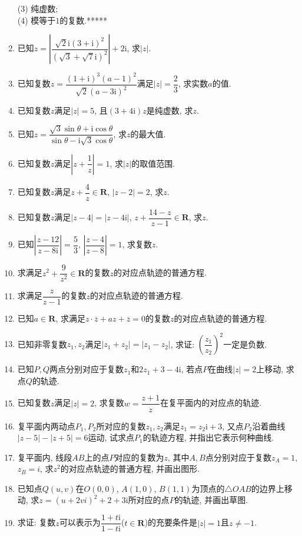 \documentclass[10pt,a4paper]{article}
\begin{document}
\begin{enumerate}[1.]
(3) 纯虚数;\\
(4) 模等于$1$的复数.*****
\item 已知$z=|\dfrac{\sqrt 2\mathrm{i}(3+\mathrm{i})^2}{(\sqrt 3+\sqrt 7\mathrm{i})^2}|+2\mathrm{i}$, 求$|z|$.
\item 已知复数$z=\dfrac{(1+\mathrm{i})^3(a-1)^2}{\sqrt 2(a-3\mathrm{i})^2}$满足$|z|=\dfrac 23$, 求实数$a$的值.
\item 已知复数$z$满足$|z|=5$, 且$(3+4\mathrm{i})z$是纯虚数, 求$z$.
\item 已知$z=\dfrac{\sqrt 3\sin \theta +\mathrm{i}\cos \theta }{\sin \theta -\mathrm{i}\sqrt 3\cos \theta }$, 求$z$的最大值.
\item 已知复数$z$满足$|z+\dfrac 1z|=1$, 求$|z|$的取值范围.
\item 已知复数$z$满足$z+\dfrac 4z\in \mathbf{R}$, $|z-2|=2$, 求$z$.
\item 已知复数$z$满足$|z-4|=|z-4\mathrm{i}|$, $z+\dfrac{14-z}{z-1}\in \mathbf{R}$, 求$z$.
\item 已知$|\dfrac{z-12}{z-8\mathrm{i}}|=\dfrac 53$, $|\dfrac{z-4}{z-8}|=1$, 求复数$z$.
\item 求满足$z^2+\dfrac 9{z^2}\in \mathbf{R}$的复数$z$的对应点轨迹的普通方程.
\item 求满足$\dfrac z{z-1}$的复数$z$的对应点轨迹的普通方程.
\item 已知$a\in \mathbf{R}$, 求满足$z\cdot \overline z+az+\overline z=0$的复数$z$的对应点轨迹的普通方程.
\item 已知非零复数$z_1,z_2$满足$|z_1+z_2|=|z_1-z_2|$, 求证: $(\dfrac{z_1}{z_2})^2$一定是负数.
\item 已知$P,Q$两点分别对应于复数$z_1$和$2z_1+3-4\mathrm{i}$, 若点$P$在曲线$|z|=2$上移动, 求点$Q$的轨迹.
\item 已知复数$z$满足$|z|=2$, 求复数$w =\dfrac{z+1}z$在复平面内的对应点的轨迹.
\item 复平面内两动点$P_1,P_2$所对应的复数$z_1,z_2$满足$z_1=z_2\mathrm{i}+3$, 又点$P_2$沿着曲线$|z-5|-|z+5|=6$运动, 试求点$P_1$的轨迹方程, 并指出它表示何种曲线.
\item 复平面内, 线段$AB$上的点$P$对应的复数为$z$, 其中$A,B$点分别对应于复数$z_A=1$, $z_B=i$, 求$z^2$的对应点轨迹的普通方程, 并画出图形.
\item 已知点$Q(u,v)$在$O(0,0)$, $A(1,0)$, $B(1,1)$为顶点的$\triangle OAB$的边界上移动, 求$z=(u+2vi)^2+2+3\mathrm{i}$所对应的点$P$的轨迹, 并画出草图.
\item 求证: 复数$z$可以表示为$\dfrac{1+t\mathrm{i}}{1-t\mathrm{i}}$($t\in \mathbf{R}$)的充要条件是$|z|=1$且$z\ne -1$.

\end{enumerate}
\end{document}
